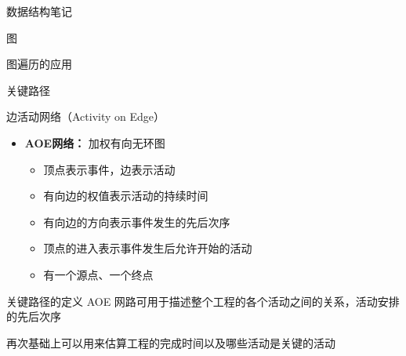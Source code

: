 \documentclass[
  ignorenonframetext,
]{beamer}
\providecommand{\tightlist}{%
  \setlength{\itemsep}{0pt}\setlength{\parskip}{0pt}}
\begin{document}
\begin{frame}[fragile]{数据结构笔记}
\begin{block}{图}
\begin{block}{图遍历的应用}
\begin{block}{关键路径}
\protect{}\label{ux5173ux952eux8defux5f84}
\begin{block}{边活动网络（Activity on Edge）}
\protect{}\label{ux8fb9ux6d3bux52a8ux7f51ux7edcactivity-on-edge}
\begin{itemize}
\tightlist
\item
  \textbf{AOE网络：} 加权有向无环图

  \begin{itemize}
  \tightlist
  \item
    顶点表示事件，边表示活动
  \item
    有向边的权值表示活动的持续时间
  \item
    有向边的方向表示事件发生的先后次序
  \item
    顶点的进入表示事件发生后允许开始的活动
  \item
    有一个源点、一个终点
  \end{itemize}
\end{itemize}
\end{block}

\begin{block}{关键路径的定义}
\protect{}\label{ux5173ux952eux8defux5f84ux7684ux5b9aux4e49}
AOE 网路可用于描述整个工程的各个活动之间的关系，活动安排的先后次序

再次基础上可以用来估算工程的完成时间以及哪些活动是关键的活动
\end{block}
\end{block}
\end{block}
\end{block}
\end{frame}
\end{document}
